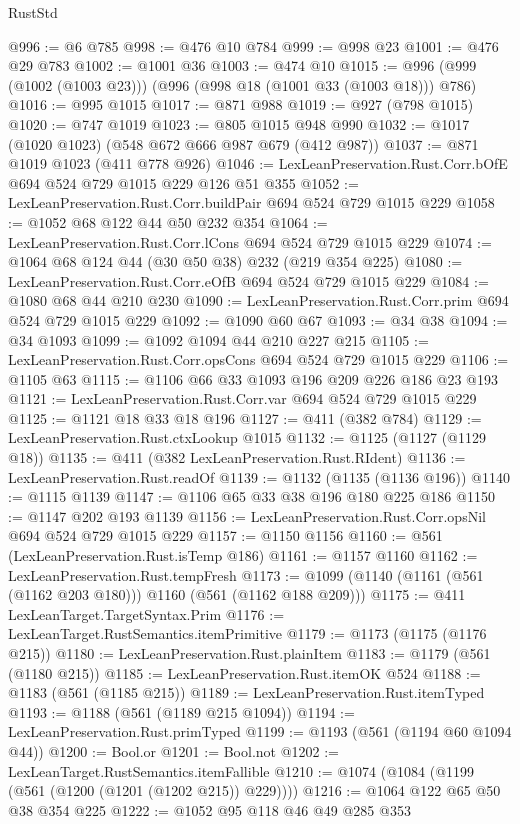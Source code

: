 \begin{lexlean}{RustStd}
\begin{coremodule}
@996 := @6 @785
@998 := @476 @10 @784
@999 := @998 @23
@1001 := @476 @29 @783
@1002 := @1001 @36
@1003 := @474 @10
@1015 := @996 (@999 (@1002 (@1003 @23))) (@996 (@998 @18 (@1001 @33 (@1003 @18))) @786)
@1016 := @995 @1015
@1017 := @871 @988
@1019 := @927 (@798 @1015)
@1020 := @747 @1019
@1023 := @805 @1015 @948 @990
@1032 := @1017 (@1020 @1023) (@548 @672 @666 @987 @679 (@412 @987))
@1037 := @871 @1019 @1023 (@411 @778 @926)
@1046 := LexLeanPreservation.Rust.Corr.bOfE @694 @524 @729 @1015 @229 @126 @51 @355
@1052 := LexLeanPreservation.Rust.Corr.buildPair @694 @524 @729 @1015 @229
@1058 := @1052 @68 @122 @44 @50 @232 @354
@1064 := LexLeanPreservation.Rust.Corr.lCons @694 @524 @729 @1015 @229
@1074 := @1064 @68 @124 @44 (@30 @50 @38) @232 (@219 @354 @225)
@1080 := LexLeanPreservation.Rust.Corr.eOfB @694 @524 @729 @1015 @229
@1084 := @1080 @68 @44 @210 @230
@1090 := LexLeanPreservation.Rust.Corr.prim @694 @524 @729 @1015 @229
@1092 := @1090 @60 @67
@1093 := @34 @38
@1094 := @34 @1093
@1099 := @1092 @1094 @44 @210 @227 @215
@1105 := LexLeanPreservation.Rust.Corr.opsCons @694 @524 @729 @1015 @229
@1106 := @1105 @63
@1115 := @1106 @66 @33 @1093 @196 @209 @226 @186 @23 @193
@1121 := LexLeanPreservation.Rust.Corr.var @694 @524 @729 @1015 @229
@1125 := @1121 @18 @33 @18 @196
@1127 := @411 (@382 @784)
@1129 := LexLeanPreservation.Rust.ctxLookup @1015
@1132 := @1125 (@1127 (@1129 @18))
@1135 := @411 (@382 LexLeanPreservation.Rust.RIdent)
@1136 := LexLeanPreservation.Rust.readOf
@1139 := @1132 (@1135 (@1136 @196))
@1140 := @1115 @1139
@1147 := @1106 @65 @33 @38 @196 @180 @225 @186
@1150 := @1147 @202 @193 @1139
@1156 := LexLeanPreservation.Rust.Corr.opsNil @694 @524 @729 @1015 @229
@1157 := @1150 @1156
@1160 := @561 (LexLeanPreservation.Rust.isTemp @186)
@1161 := @1157 @1160
@1162 := LexLeanPreservation.Rust.tempFresh
@1173 := @1099 (@1140 (@1161 (@561 (@1162 @203 @180))) @1160 (@561 (@1162 @188 @209)))
@1175 := @411 LexLeanTarget.TargetSyntax.Prim
@1176 := LexLeanTarget.RustSemantics.itemPrimitive
@1179 := @1173 (@1175 (@1176 @215))
@1180 := LexLeanPreservation.Rust.plainItem
@1183 := @1179 (@561 (@1180 @215))
@1185 := LexLeanPreservation.Rust.itemOK @524
@1188 := @1183 (@561 (@1185 @215))
@1189 := LexLeanPreservation.Rust.itemTyped
@1193 := @1188 (@561 (@1189 @215 @1094))
@1194 := LexLeanPreservation.Rust.primTyped
@1199 := @1193 (@561 (@1194 @60 @1094 @44))
@1200 := Bool.or
@1201 := Bool.not
@1202 := LexLeanTarget.RustSemantics.itemFallible
@1210 := @1074 (@1084 (@1199 (@561 (@1200 (@1201 (@1202 @215)) @229))))
@1216 := @1064 @122 @65 @50 @38 @354 @225
@1222 := @1052 @95 @118 @46 @49 @285 @353

\end{coremodule}
\end{lexlean}
